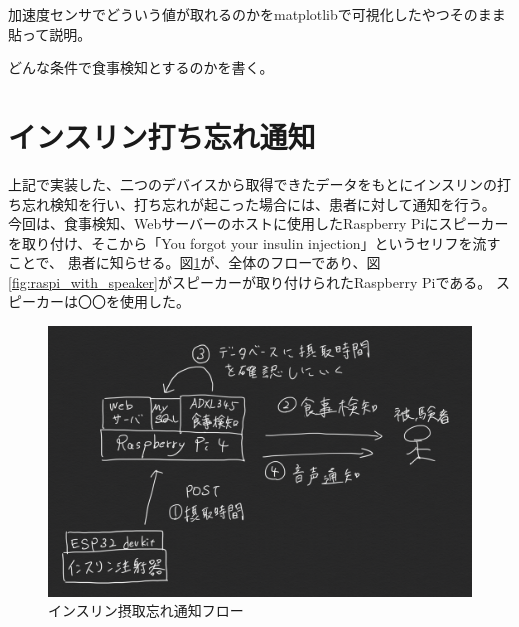 加速度センサでどういう値が取れるのかをmatplotlibで可視化したやつそのまま貼って説明。

どんな条件で食事検知とするのかを書く。

\section{インスリン打ち忘れ通知}

上記で実装した、二つのデバイスから取得できたデータをもとにインスリンの打ち忘れ検知を行い、打ち忘れが起こった場合には、患者に対して通知を行う。
今回は、食事検知、Webサーバーのホストに使用したRaspberry Piにスピーカーを取り付け、そこから「You forgot your insulin injection」というセリフを流すことで、
患者に知らせる。図\ref{fig:system_flow}が、全体のフローであり、図\ref{fig:raspi_with_speaker}がスピーカーが取り付けられたRaspberry Piである。
スピーカーは〇〇を使用した。

\begin{figure}[htbp]
  \caption{インスリン摂取忘れ通知フロー}
  \label{fig:system_flow}
  \begin{center}
    \includegraphics[bb=0 0 1000 600,width=15cm]{assets/system_flow.png}
  \end{center}
\end{figure}

